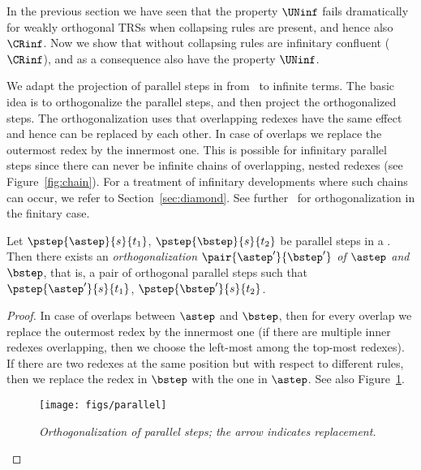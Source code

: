 In the previous section we have seen that the property $\UNinf$ 
fails dramatically for weakly orthogonal TRSs when collapsing rules are present,
and hence also $\CRinf$. 
Now we show that  without collapsing 
rules are infinitary confluent ($\CRinf$),
and as a consequence also have the property $\UNinf$.

We adapt the projection of parallel steps in 
from~\cite[Section~8.8.4.]{terese:2003} to infinite terms.
The basic idea is to orthogonalize the parallel steps,
and then project the orthogonalized steps.
The orthogonalization uses that overlapping redexes 
have the same effect and hence can be replaced by each other.
In case of overlaps we replace the outermost redex by the innermost one.
This is possible for infinitary parallel steps since there
can never be infinite chains of overlapping, nested redexes (see Figure~\ref{fig:chain}).
For a treatment of infinitary developments where such chains can occur,
we refer to Section~\ref{sec:diamond}.
See further~\cite[Proposition~8.8.23]{terese:2003} for orthogonalization 
in the finitary case.

\begin{proposition}
  Let $\pstep{\astep}{s}{t_1}$, $\pstep{\bstep}{s}{t_2}$ be parallel steps in a \woTRS{}.
  Then there exists an \emph{orthogonalization $\pair{\astep'}{\bstep'}$ of $\astep$ and $\bstep$},
  that is, a pair of orthogonal parallel steps such that $\pstep{\astep'}{s}{t_1}$, $\pstep{\bstep'}{s}{t_2}$.
\end{proposition}

\begin{proof}
In case of overlaps between $\astep$ and $\bstep$, 
then for every overlap we replace the outermost redex by the innermost one
(if there are multiple inner redexes overlapping, then we choose the left-most among the top-most redexes).
If there are two redexes at the same position but with respect to different rules,
then we replace the redex in $\bstep$ with the one in $\astep$.
See also Figure~\ref{fig:orthogonalization:parallel}.
\begin{figure}[hpt!]
\begin{center}
  \texttt{[image: figs/parallel]}
\end{center}\vspace{-3ex}
\caption{\textit{Orthogonalization of parallel steps; the arrow indicates replacement.}}
\label{fig:orthogonalization:parallel}
\end{figure}
\end{proof}

